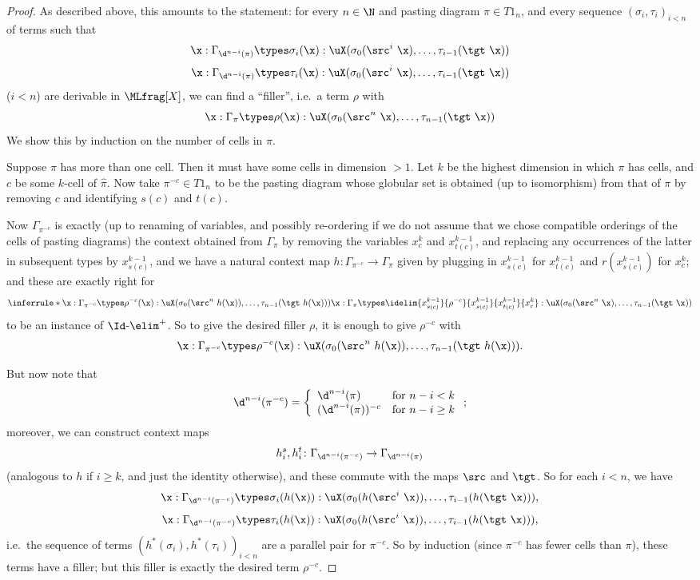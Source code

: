 \begin{proof}As described above, this amounts to the statement: for every $n \in \N$ and pasting diagram $\pi \in T1_n$, and every sequence $(\sigma_i,\tau_i)_{i<n}$ of terms such that
\[\x : \Gamma_{\d^{n-i}(\pi)} \types \sigma_i(\x) : \uX
(\sigma_0(\src^i\ \x),\ldots,\tau_{i-1}(\tgt\ \x))
\]
\[\x : \Gamma_{\d^{n-i}(\pi)} \types \tau_i(\x) : \uX
(\sigma_0(\src^i\ \x),\ldots,\tau_{i-1}(\tgt\ \x))
\]
($i < n$) are derivable in $\MLfrag[X]$, we can find a ``filler'', i.e.\ a term $\rho$ with
\[\x : \Gamma_\pi \types \rho(\x) : \uX (\sigma_0(\src^n\
\x),\ldots,\tau_{n-1}(\tgt\ \x))
\]
We show this by induction on the number of cells in $\pi$.

Suppose $\pi$ has more than one cell.  Then it must have some cells in dimension $> 1$.  Let $k$ be the highest dimension in which $\pi$ has cells, and $c$ be some $k$-cell of $\hat{\pi}$.  Now take $\pi^{-c} \in T1_n$ to be the pasting diagram whose globular set is obtained (up to isomorphism) from that of $\pi$ by removing $c$ and identifying $s(c)$ and $t(c)$.

Now $\Gamma_{\pi^{-c}}$ is exactly (up to renaming of variables, and possibly re-ordering if we do not assume that we chose compatible orderings of the cells of pasting diagrams) the context obtained from $\Gamma_\pi$ by removing the variables $x^k_c$ and $x^{k-1}_{t(c)}$, and replacing any occurrences of the latter in subsequent types by $x^{k-1}_{s(c)}$, and we have a natural context map $h \colon \Gamma_{\pi^{-c}} \to \Gamma_\pi$ given by plugging in $x^{k-1}_{s(c)}$ for $x^{k-1}_{t(c)}$ and $r(x^{k-1}_{s(c)})$ for $x^k_c$; and these are exactly right for
\[\inferrule*{\x:\Gamma_{\pi^{-c}} \types \rho^{-c}(\x) : \uX
(\sigma_0(\src^n\ h(\x)),\ldots,\tau_{n-1}(\tgt\ h(\x)))}{\x :
\Gamma_\pi \types
\idelim{x^{k-1}_{s(c)}}{\rho^{-c}}{x^{k-1}_{s(c)}}{x^{k-1}_{t(c)}}{x^k_c}
: \uX (\sigma_0(\src^n\ \x),\ldots,\tau_{n-1}(\tgt\ \x))}
\]
to be an instance of $\Id$-$\elim^+$.  So to give the desired filler $\rho$, it is enough to give $\rho^{-c}$ with
\[\x:\Gamma_{\pi^{-c}} \types \rho^{-c}(\x) : \uX (\sigma_0(\src^n\
h(\x)),\ldots,\tau_{n-1}(\tgt\ h(\x))).
\]

But now note that
\[\d^{n-i}(\pi^{-c}) = \left\{ \begin{array}{ll} \d^{n-i}(\pi) &
\textrm{for $n-i < k$} \\ (\d^{n-i}(\pi))^{-c} & \textrm{for $n-i \geq
k$} \end{array} \right. ;
\] 
moreover, we can construct context maps
\[h^s_i, h^t_i \colon \Gamma_{\d^{n-i}(\pi^{-c})} \to
\Gamma_{\d^{n-i}(\pi)}
\]
(analogous to $h$ if $i \geq k$, and just the identity otherwise), and these commute with the maps $\src$ and $\tgt$.  So for each $i < n$, we have
\[\x : \Gamma_{\d^{n-i}(\pi^{-c})} \types \sigma_i(h(\x)) : \uX
(\sigma_0(h(\src^i\ \x)),\ldots,\tau_{i-1}(h(\tgt\ \x))),
\]
\[\x : \Gamma_{\d^{n-i}(\pi^{-c})} \types \tau_i(h(\x)) : \uX
(\sigma_0(h(\src^i\ \x)),\ldots,\tau_{i-1}(h(\tgt\ \x))),
\]
i.e.\ the sequence of terms $(h^*(\sigma_i),h^*(\tau_i))_{i<n}$ are a parallel pair for $\pi^{-c}$.  So by induction (since $\pi^{-c}$ has fewer cells than $\pi$), these terms have a filler; but this filler is exactly the desired term $\rho^{-c}$.


\end{proof}
